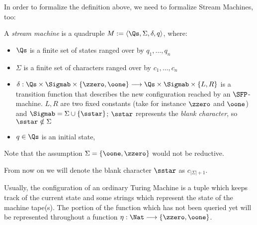 \begin{conditional}{\notappendix}

  In order to formalize the definition above, we need to formalize Stream Machines, too:





    \begin{defn}
      \label{def:sm}
    A \emph{stream machine} is a quadruple
    $M:= \langle \Qs,\Sigma, \delta,q\rangle$,
    where:
    \begin{itemize}
    \itemsep0em
    \item $\Qs$ is a finite set of states ranged over by
    $q_1,\dots, q_n$
    \item $\Sigma$ is a finite set of characters ranged
    over by $c_1,\dots, c_n$
    \item $\delta:\Qs \times \Sigmab \times
    \{\zzero, \oone\} \longrightarrow \Qs
    \times \Sigmab \times \{L,R\}$
    is a transition function that describes the new configuration
    reached by an $\SFP$-machine.
    $L,R$ are two fixed constants
    (take for instance $\zzero$ and $\oone$) and
    $\Sigmab=\Sigma\cup \{\sstar\}$;
    $\sstar$ represents the \emph{blank character}, so
    $\sstar\notin \Sigma$
    \item $q\in \Qs$ is an initial state,
    \end{itemize}
    Note that the assumption $\Sigma=\{\oone,\zzero\}$
    would not be reductive.
    \end{defn}

    \begin{notation}
    From now on we will denote the blank character
    $\sstar$ as $c_{|\Sigma|+1}$.
    \end{notation}

    Usually, the configuration of an ordinary Turing Machine is a tuple
    which keeps track of the current state and some strings which represent the
    state of the machine tape(s). The portion of the function which has not been
    queried yet will be represented throughout a function
    $\eta: \Nat \longrightarrow \{\zzero, \oone\}$.



\end{conditional}
